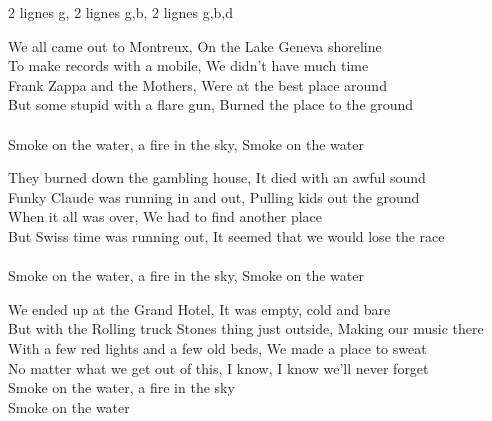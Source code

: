 2 lignes g, 2 lignes g,b, 2 lignes g,b,d

We all came out to Montreux, On the Lake Geneva shoreline \\
To make records with a mobile, We didn't have much time \\
Frank Zappa and the Mothers, Were at the best place around \\
But some stupid with a flare gun, Burned the place to the ground \\
\\
Smoke on the water, a fire in the sky, Smoke on the water \\




They burned down the gambling house,  It died with an awful sound \\
Funky Claude was running in and out,     Pulling kids out the ground \\
When it all was over,     We had to find another place \\
But Swiss time was running out,     It seemed that we would lose the race \\
\\
Smoke on the water, a fire in the sky,     Smoke on the water \\




We ended up at the Grand Hotel,     It was empty, cold and bare \\
But with the Rolling truck Stones thing just outside,     Making our music there \\
With a few red lights and a few old beds,     We made a place to sweat \\
No matter what we get out of this,     I know, I know we'll never forget \\

Smoke on the water, a fire in the sky \\
Smoke on the water \\

